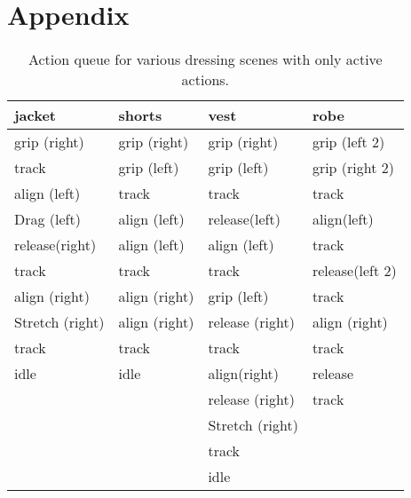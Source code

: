 \section{Appendix}

\begin{table}
	
  \begin{tabular}{|l|l|l|l|}
    \hline
    jacket 				& shorts 		& vest 			& robe \\
    \hline
    grip (right) 		& grip (right)	& grip (right)	& grip (left 2) \\
    track 				& grip (left)	& grip (left) 	& grip (right 2) \\
    align (left) 		& track 		& track 		& track\\
    Drag (left)			& align (left)	& release(left)	& align(left)\\
    release(right) 		& align (left)	& align (left)	& track\\
    track 				& track			& track			& release(left 2)\\
    align (right) 		& align (right) & grip (left)	& track\\
    Stretch	(right)		& align (right)	& release (right)& align (right)\\
    track 				& track 		& track			& track\\
    idle				& idle			& align(right)	& release\\
    					&				& release (right)& track \\
    					&				& Stretch (right)& \\
    					&				& track 		&  \\
    					&				& idle			& \\
    \hline
  \end{tabular}
  \caption{Action queue for various dressing scenes with only active actions.}
  \label{table:data}
\end{table}